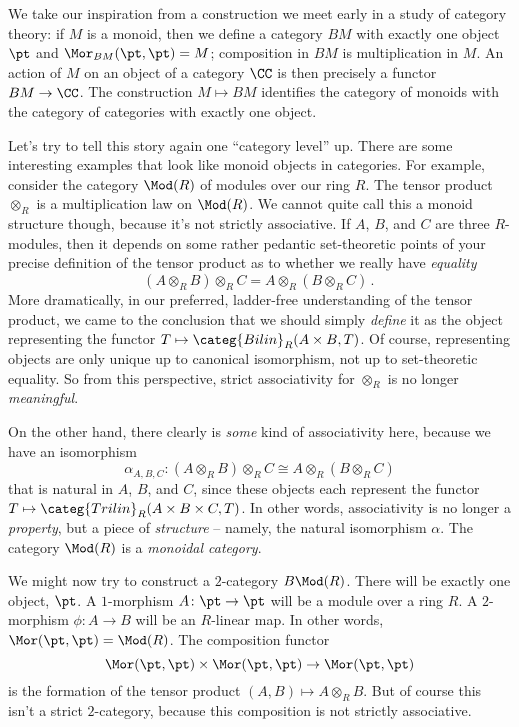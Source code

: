 We take our inspiration from a construction we meet early in a study of category theory:
if $M$ is a monoid, then we define a category $BM$ with exactly one object $\pt$ and $\Mor_{BM}(\pt,\pt) = M$;
composition in $BM$ is multiplication in $M$.
An action of $M$ on an object of a category $\CC$ is then precisely a functor $BM \to \CC$.
The construction $M \mapsto BM$ identifies the category of monoids with the category of categories with exactly one object.

Let's try to tell this story again one \enquote{category level} up.
There are some interesting examples that look like monoid objects in categories.
For example, consider the category $\Mod(R)$ of modules over our ring $R$.
The tensor product $\otimes_R$ is a multiplication law on $\Mod(R)$.
We cannot quite call this a monoid structure though, because it's not strictly associative.
If $A$, $B$, and $C$ are three $R$-modules, then it depends on some rather pedantic set-theoretic points of your precise definition of the tensor product as to whether we really have \emph{equality}
\[
  (A \otimes_R B) \otimes_R C = A \otimes_R (B \otimes_R C) \period
\]
More dramatically, in our preferred, ladder-free understanding of the tensor product, we came to the conclusion that we should simply \emph{define} it as the object representing the functor $T \mapsto \categ{Bilin}_R(A \times B,T)$.
Of course, representing objects are only unique up to canonical isomorphism, not up to set-theoretic equality.
So from this perspective, strict associativity for $\otimes_R$ is no longer \emph{meaningful}.

On the other hand, there clearly is \emph{some} kind of associativity here, because we have an isomorphism
\[
  \alpha_{A,B,C} \colon (A \otimes_R B) \otimes_R C \cong A \otimes_R (B \otimes_R C)
\]
that is natural in $A$, $B$, and $C$,
since these objects each represent the functor $T \mapsto \categ{Trilin}_R(A \times B \times C, T)$.
In other words, associativity is no longer a \emph{property}, but a piece of \emph{structure} --
namely, the natural isomorphism $\alpha$.
The category $\Mod(R)$ is a \emph{monoidal category}.

We might now try to construct a $2$-category $B\Mod(R)$. 
There will be exactly one object, $\pt$.
A $1$-morphism $A \colon \pt \to \pt$ will be a module over a ring $R$.
A $2$-morphism $\phi \colon A \to B$ will be an $R$-linear map.
In other words, $\Mor(\pt,\pt) = \Mod(R)$.
The composition functor
\[
  \Mor(\pt, \pt) \times \Mor(\pt,\pt) \to \Mor(\pt,\pt)
\]
is the formation of the tensor product $(A,B) \mapsto A \otimes_R B$.
But of course this isn't a strict $2$-category, because this composition is not strictly associative.

